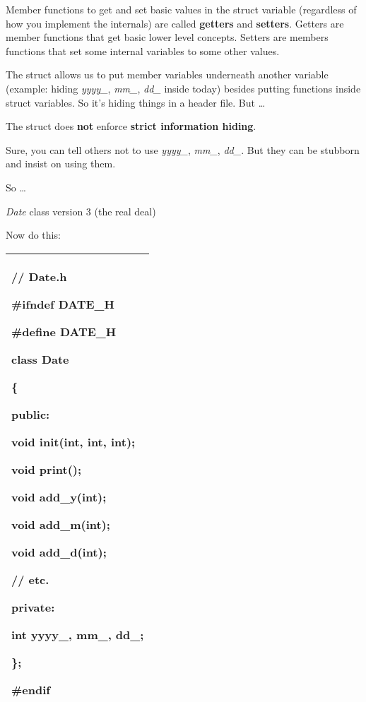 \documentclass[
]{article}
\begin{document}
Member functions to get and set basic values in the struct variable
(regardless of how you implement the internals) are called
\textbf{getters} and \textbf{setters}. Getters are member functions that
get basic lower level concepts. Setters are members functions that set
some internal variables to some other values.

The struct allows us to put member variables underneath another variable
(example: hiding \emph{yyyy\_}, \emph{mm\_}, \emph{dd\_} inside today)
besides putting functions inside struct variables. So it's hiding things
in a header file. But \ldots{}

The struct does \textbf{not} enforce \textbf{strict information hiding}.

Sure, you can tell others not to use \emph{yyyy\_}, \emph{mm\_},
\emph{dd\_}. But they can be stubborn and insist on using them.

So \ldots{}

\emph{Date} class version 3 (the real deal)

Now do this:

\begin{longtable}[]{@{}l@{}}
\toprule
\endhead
\begin{minipage}[t]{0.97\columnwidth}\raggedright
// Date.h

\#ifndef DATE\_H

\#define DATE\_H

\textbf{class} Date

\{

public:

void init(int, int, int);

void print();

void add\_y(int);

void add\_m(int);

void add\_d(int);

// etc.

private:

int yyyy\_, mm\_, dd\_;

\};

\#endif\strut
\end{minipage}\tabularnewline
\bottomrule
\end{longtable}
\end{document}

